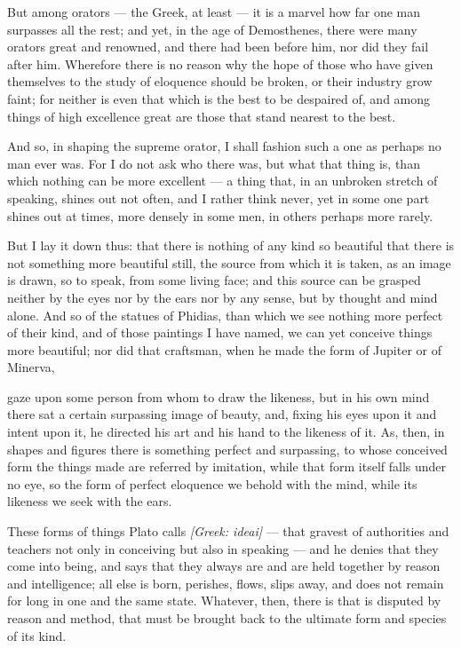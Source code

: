  But among orators — the Greek, at least — it is a marvel how far one man surpasses all the rest; and yet, in the age of Demosthenes, there were many orators great and renowned, and there had been before him, nor did they fail after him. Wherefore there is no reason why the hope of those who have given themselves to the study of eloquence should be broken, or their industry grow faint; for neither is even that which is the best to be despaired of, and among things of high excellence great are those that stand nearest to the best.

 And so, in shaping the supreme orator, I shall fashion such a one as perhaps no man ever was. For I do not ask who there was, but what that thing is, than which nothing can be more excellent — a thing that, in an unbroken stretch of speaking, shines out not often, and I rather think never, yet in some one part shines out at times, more densely in some men, in others perhaps more rarely.

 But I lay it down thus: that there is nothing of any kind so beautiful that there is not something more beautiful still, the source from which it is taken, as an image is drawn, so to speak, from some living face; and this source can be grasped neither by the eyes nor by the ears nor by any sense, but by thought and mind alone. And so of the statues of Phidias, than which we see nothing more perfect of their kind, and of those paintings I have named, we can yet conceive things more beautiful; nor did that craftsman, when he made the form of Jupiter or of Minerva,

 gaze upon some person from whom to draw the likeness, but in his own mind there sat a certain surpassing image of beauty, and, fixing his eyes upon it and intent upon it, he directed his art and his hand to the likeness of it. As, then, in shapes and figures there is something perfect and surpassing, to whose conceived form the things made are referred by imitation, while that form itself falls under no eye, so the form of perfect eloquence we behold with the mind, while its likeness we seek with the ears.

 These forms of things Plato calls \textit{[Greek: ideai]} — that gravest of authorities and teachers not only in conceiving but also in speaking — and he denies that they come into being, and says that they always are and are held together by reason and intelligence; all else is born, perishes, flows, slips away, and does not remain for long in one and the same state. Whatever, then, there is that is disputed by reason and method, that must be brought back to the ultimate form and species of its kind.

